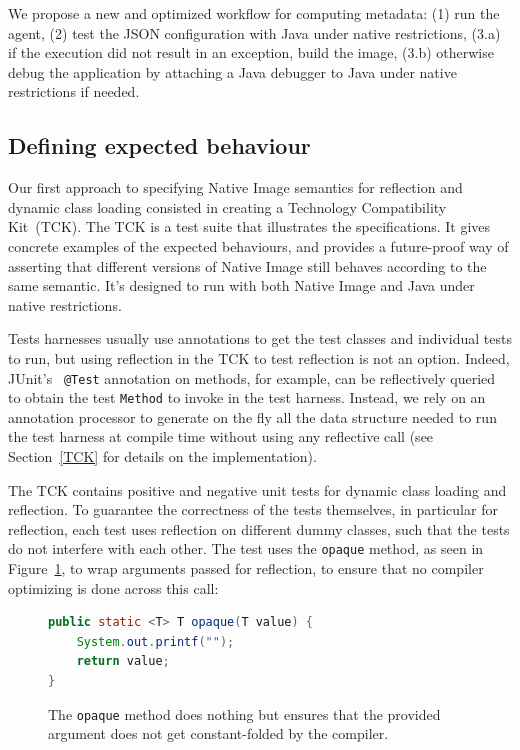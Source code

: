 We propose a new and optimized workflow for computing metadata: (1) run the agent, (2) test the JSON configuration with Java under native restrictions, (3.a) if the execution did not result in an exception, build the image, (3.b) otherwise debug the application by attaching a Java debugger to Java under native restrictions if needed.

\subsection{Defining expected behaviour}
Our first approach to specifying Native Image semantics for reflection and dynamic class loading consisted in creating a Technology Compatibility Kit~(TCK). The TCK is a test suite that illustrates the specifications. It gives concrete examples of the expected behaviours, and provides a future-proof way of asserting that different versions of Native Image still behaves according to the same semantic.
It's designed to run with both Native Image and Java under native restrictions.

Tests harnesses usually use annotations to get the test classes and individual tests to run, but using reflection in the TCK to test reflection is not an option. Indeed, JUnit's~\cite{noauthor_junit_nodate} \verb|@Test| annotation on methods, for example, can be reflectively queried to obtain the test \verb|Method| to invoke in the test harness. Instead, we rely on an annotation processor to generate on the fly all the data structure needed to run the test harness at compile time without using any reflective call (see Section~\ref{TCK} for details on the implementation).

The TCK contains positive and negative unit tests for dynamic class loading and reflection. To guarantee the correctness of the tests themselves, in particular for reflection, each test uses reflection on different dummy classes, such that the tests do not interfere with each other.
The test uses the \verb|opaque| method, as seen in Figure~\ref{fig:opaque}, to wrap arguments passed for reflection, to ensure that no compiler optimizing is done across this call:
\begin{figure}[ht]
    \centering
\begin{lstlisting}[language=Java]
public static <T> T opaque(T value) {
    System.out.printf("");
    return value;
}
\end{lstlisting}
    \caption{The \texttt{opaque} method does nothing but ensures that the provided argument does not get constant-folded by the compiler.}
    \label{fig:opaque}
\end{figure}


